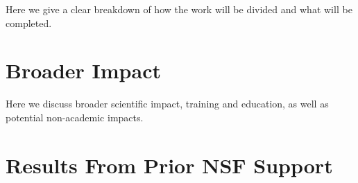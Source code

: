 Here we give a clear breakdown of how the work will be divided and what will be completed.

\section{Broader Impact}

Here we discuss broader scientific impact, training and education, as well as potential non-academic impacts.

\section{Results From Prior NSF Support}




